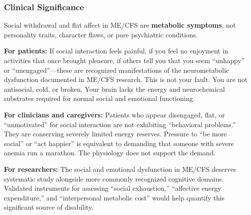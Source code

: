 \subsubsection{Clinical Significance}

\begin{tcolorbox}[colback=blue!5!white,colframe=blue!75!black,title=Recognition and Validation]
Social withdrawal and flat affect in ME/CFS are \textbf{metabolic symptoms}, not personality traits, character flaws, or pure psychiatric conditions.

\textbf{For patients:} If social interaction feels painful, if you feel no enjoyment in activities that once brought pleasure, if others tell you that you seem ``unhappy'' or ``unengaged''---these are recognized manifestations of the neurometabolic dysfunction documented in ME/CFS research. This is not your fault. You are not antisocial, cold, or broken. Your brain lacks the energy and neurochemical substrates required for normal social and emotional functioning.

\textbf{For clinicians and caregivers:} Patients who appear disengaged, flat, or ``unmotivated'' for social interaction are not exhibiting ``behavioral problems.'' They are conserving severely limited energy reserves. Pressure to ``be more social'' or ``act happier'' is equivalent to demanding that someone with severe anemia run a marathon. The physiology does not support the demand.

\textbf{For researchers:} The social and emotional dysfunction in ME/CFS deserves systematic study alongside more commonly recognized cognitive domains. Validated instruments for assessing ``social exhaustion,'' ``affective energy expenditure,'' and ``interpersonal metabolic cost'' would help quantify this significant source of disability.
\end{tcolorbox}

